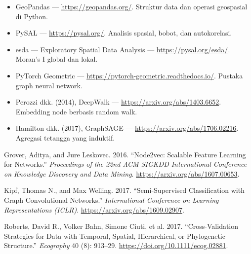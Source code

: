 \begin{bacaan}

\begin{itemize}
\tightlist
\item
  GeoPandas --- \url{https://geopandas.org/}. Struktur data dan operasi geospasial di Python.
\item
  PySAL --- \url{https://pysal.org/}. Analisis spasial, bobot, dan autokorelasi.
\item
  esda --- Exploratory Spatial Data Analysis --- \url{https://pysal.org/esda/}. Moran's I global dan lokal.
\item
  PyTorch Geometric --- \url{https://pytorch-geometric.readthedocs.io/}. Pustaka graph neural network.
\item
  Perozzi dkk. (2014), DeepWalk --- \url{https://arxiv.org/abs/1403.6652}. Embedding node berbasis random walk.
\item
  Hamilton dkk. (2017), GraphSAGE --- \url{https://arxiv.org/abs/1706.02216}. Agregasi tetangga yang induktif.
\end{itemize}

\end{bacaan}

\rujukanheading

\protect{}\label{refs}
\begin{CSLReferences}{1}{1}
Grover, Aditya, and Jure Leskovec. 2016. {``Node2vec: Scalable Feature Learning for Networks.''} \emph{Proceedings of the 22nd ACM SIGKDD International Conference on Knowledge Discovery and Data Mining}. \url{https://arxiv.org/abs/1607.00653}.

Kipf, Thomas N., and Max Welling. 2017. {``Semi-Supervised Classification with Graph Convolutional Networks.''} \emph{International Conference on Learning Representations (ICLR)}. \url{https://arxiv.org/abs/1609.02907}.

Roberts, David R., Volker Bahn, Simone Ciuti, et al. 2017. {``Cross-Validation Strategies for Data with Temporal, Spatial, Hierarchical, or Phylogenetic Structure.''} \emph{Ecography} 40 (8): 913--29. \url{https://doi.org/10.1111/ecog.02881}.

\end{CSLReferences}
